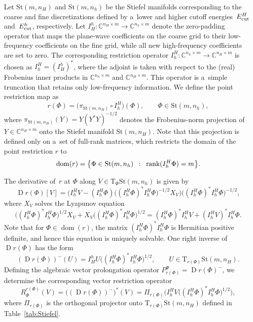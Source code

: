 \documentclass[11pt,reqno]{amsart}
\theoremstyle{plain}
\newcommand\C{\mathbb C}
\DeclareMathOperator{\Drm}{D}
\DeclareMathOperator{\dom}{dom}
\DeclareMathOperator{\rank}{rank}
\def\restr{r}
\newcommand{\Tan}{\mathrm{T}}
\newcommand{\St}{\mathrm{St}}
\begin{document}
	Let $\St(m,n_H)$ and $\St(m,n_h)$ be the Stiefel manifolds corresponding to the coarse and fine discretizations defined by a~lower and higher cutoff energies~$E_{\rm cut}^H$ and~$E_{\rm cut}^h$, respectively. Let \mbox{$I_H^h:\C^{n_H\times m}\rightarrow\C^{n_h\times m}$} denote the zero-padding operator that maps the plane-wave coefficients on the coarse grid to their low-frequency coefficients on the fine grid, while all new high-frequency coefficients are set to zero. The corresponding restriction operator $I_h^H:\C^{n_h\times m}\rightarrow\C^{n_H\times m}$ is chosen as 
	$I_h^H=(I_H^h)^{\ast}$, where the adjoint is taken with respect to the (real) Frobenius inner products in $\C^{n_h\times m}$ and $\C^{n_H\times m}$. This operator is a~simple truncation that retains only low-frequency information. We define the point restriction map as
	\[
	\restr(\Phi)
	=\big(\pi_{\St(m,n_H)}\!\circ I_h^H\big)(\Phi), 
	\qquad\Phi\in\St(m,n_h), 
	\]
	where $\pi_{\St(m,n_H)}(Y)=Y(Y^{\ast}Y)^{-1/2}$ denotes the Frobenius-norm projection of $Y\in\C^{n_H\times m}$ onto the Stiefel manifold $\St(m,n_H)$. Note that this projection is defined only on a~set of full-rank matrices, which restricts the domain of the point restriction $\restr$ to 
	\[
	\dom(\restr)=\big\{\Phi\in\St(m,n_h)\enskip :\enskip \rank(I_h^H\Phi)=m\big\}.
	\]
	
	The derivative of~$r$ at $\Phi$ along $V\in\Tan_{\Phi}\St(m,n_h)$ is given by 
	\[
	\Drm \restr(\Phi)[V]  =\big(I_h^H V - (I_h^H \Phi)\big((I_h^H \Phi)^{\ast}I_h^H \Phi\big)^{-1/2}X_V \big)\big((I_h^H \Phi)^{\ast}I_h^H \Phi\big)^{-1/2}, 
	\]
	where $X_V$ solves the Lyapunov equation
	\[ 
	\big((I_h^H \Phi)^{\ast}I_h^H \Phi\big)^{1/2}X_V + X_V \big((I_h^H \Phi)^{\ast}I_h^H \Phi\big)^{1/2} = (I_h^H \Phi)^{\ast}I_h^H V + (I_h^H V)^{\ast}I_h^H \Phi.
	\]
	Note that for $\Phi\in\dom(r)$, 
	the matrix $(I_h^H \Phi)^{\ast}I_h^H \Phi$ is Hermitian positive definite, and hence this equation is uniquely solvable. One right inverse of $\Drm \restr(\Phi)$ has the form  
	\[
	(\Drm \restr(\Phi))^-(U) =  I_H^h U \big((I_h^H \Phi)^{\ast}I_h^H \Phi\big)^{1/2}, \qquad U\in\Tan_{r(\Phi)} \St(m,n_H).
	\]
	Defining the algebraic vector prolongation operator
	$P_{\restr(\Phi)}^{\Phi}=\Drm \restr(\Phi)^-$, we determine the corresponding vector restriction operator
	\begin{equation}\label{eq:Restr_KS}
		R_\Phi^{\restr(\Phi)}(V) 
		= \big((\Drm \restr(\Phi))^-\big)^{\ast}(V)
		= \Pi_{r(\Phi)} \big(I_h^H V \big((I_h^H \Phi)^{\ast}I_h^H \Phi\big)^{1/2}\big),
	\end{equation}
	where $\Pi_{r(\Phi)}$ is the orthogonal projector onto $\Tan_{r(\Phi)}\St(m,n_H)$ defined in Table~\ref{tab:Stiefel}.
	
\end{document}
